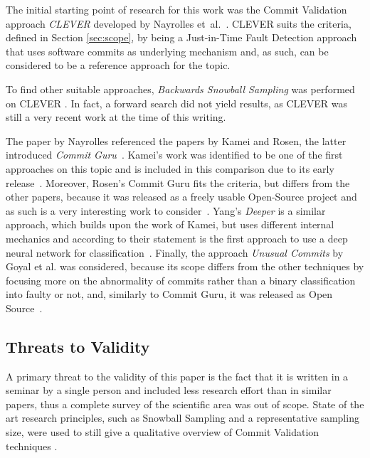 The initial starting point of research for this work was the Commit Validation approach \textit{CLEVER} developed by Nayrolles et~al.~\cite{Nayrolles2018}. CLEVER suits the criteria, defined in Section \ref{sec:scope}, by being a Just-in-Time Fault Detection approach that uses software commits as underlying mechanism and, as such, can be considered to be a reference approach for the topic.  

To find other suitable approaches, \textit{Backwards Snowball Sampling} was performed on CLEVER \cite{10.2307/2237615}. In fact, a forward search did not yield results, as CLEVER was still a very recent work at the time of this writing.

The paper by Nayrolles referenced the papers by Kamei and Rosen, the latter introduced \textit{Commit Guru}~\cite{Nayrolles2018}. Kamei's work was identified to be one of the first approaches on this topic and is included in this comparison due to its early release~\cite{Kamei2013}. Moreover, Rosen's Commit Guru fits the criteria, but differs from the other papers, because it was released as a freely usable Open-Source project and as such is a very interesting work to consider~\cite{Rosen2015}. Yang's \textit{Deeper} is a similar approach, which builds upon the work of Kamei, but uses different internal mechanics and according to their statement is the first approach to use a deep neural network for classification~\cite{Yang2015}. Finally, the approach \textit{Unusual Commits} by Goyal et al. was considered, because its scope differs from the other techniques by focusing more on the abnormality of commits rather than a binary classification into faulty or not, and, similarly to Commit Guru, it was released as Open Source~\cite{Goyal2017}.

\subsection{Threats to Validity}
\label{sec:threatstovalidity}

A primary threat to the validity of this paper is the fact that it is written in a seminar by a single person and included less research effort than in similar papers, thus a complete survey of the scientific area was out of scope. State of the art research principles, such as Snowball Sampling and a representative sampling size, were used to still give a qualitative overview of Commit Validation techniques \cite{10.2307/2237615}.

